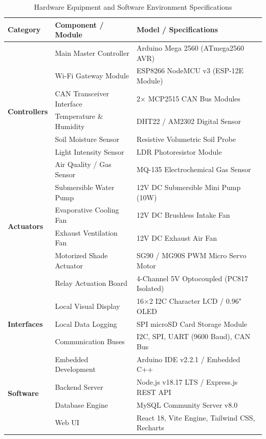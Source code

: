 \documentclass[conference]{IEEEtran}
\begin{document}
\begin{table}[htbp]
\caption{Hardware Equipment and Software Environment Specifications}
\label{tab:hardware_software}
\centering
\begin{tabularx}{\columnwidth}{l l X}
\toprule
\textbf{Category} & \textbf{Component / Module} & \textbf{Model / Specifications} \\
\midrule
\multirow{7}{*}{\textbf{Controllers}} 
 & Main Master Controller & Arduino Mega 2560 (ATmega2560 AVR) \\
 & Wi-Fi Gateway Module & ESP8266 NodeMCU v3 (ESP-12E Module) \\
 & CAN Transceiver Interface & 2$\times$ MCP2515 CAN Bus Modules \\
\midrule
\multirow{4}{*}{\textbf{Sensors}} 
 & Temperature \& Humidity & DHT22 / AM2302 Digital Sensor \\
 & Soil Moisture Sensor & Resistive Volumetric Soil Probe \\
 & Light Intensity Sensor & LDR Photoresistor Module \\
 & Air Quality / Gas Sensor & MQ-135 Electrochemical Gas Sensor \\
\midrule
\multirow{4}{*}{\textbf{Actuators}} 
 & Submersible Water Pump & 12V DC Submersible Mini Pump (10W) \\
 & Evaporative Cooling Fan & 12V DC Brushless Intake Fan \\
 & Exhaust Ventilation Fan & 12V DC Exhaust Air Fan \\
 & Motorized Shade Actuator & SG90 / MG90S PWM Micro Servo Motor \\
 & Relay Actuation Board & 4-Channel 5V Optocoupled (PC817 Isolated) \\
\midrule
\multirow{3}{*}{\textbf{Interfaces}} 
 & Local Visual Display & 16$\times$2 I2C Character LCD / 0.96" OLED \\
 & Local Data Logging & SPI microSD Card Storage Module \\
 & Communication Buses & I2C, SPI, UART (9600 Baud), CAN Bus \\
\midrule
\multirow{4}{*}{\textbf{Software}} 
 & Embedded Development & Arduino IDE v2.2.1 / Embedded C++ \\
 & Backend Server & Node.js v18.17 LTS / Express.js REST API \\
 & Database Engine & MySQL Community Server v8.0 \\
 & Web UI & React 18, Vite Engine, Tailwind CSS, Recharts \\
\bottomrule
\end{tabularx}
\end{table}
\end{document}
